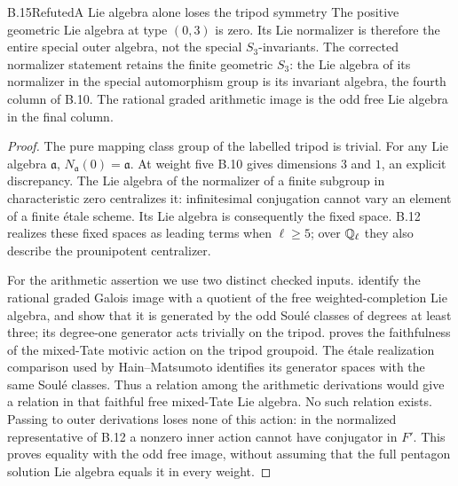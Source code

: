 \begin{statement}{B.15}{Refuted}{A Lie algebra alone loses the tripod symmetry}
The positive geometric Lie algebra at type $(0,3)$ is zero.
Its Lie normalizer is therefore the entire special outer
algebra, not the special $S_3$-invariants. The corrected
normalizer statement retains the finite geometric $S_3$:
the Lie algebra of its normalizer in the special
automorphism group is its invariant algebra, the fourth
column of B.10. The rational graded arithmetic image is
the odd free Lie algebra in the final column.
\end{statement}
\begin{proof}
The pure mapping class group of the labelled tripod is
trivial. For any Lie algebra $\mathfrak a$,
$N_{\mathfrak a}(0)=\mathfrak a$. At weight five B.10
gives dimensions $3$ and $1$, an explicit discrepancy.
The Lie algebra of the normalizer of a finite subgroup in
characteristic zero centralizes it: infinitesimal
conjugation cannot vary an element of a finite étale
scheme. Its Lie algebra is consequently the fixed space.
B.12 realizes these fixed spaces as leading terms when
$\ell\ge5$; over $\mathbb Q_\ell$ they also describe the
prounipotent centralizer.

For the arithmetic assertion we use two distinct checked
inputs. \citet[Theorem 8.4, Theorem 7.3 and Lemma 8.5]{HainMatsumoto2003}
identify the rational graded Galois image with a quotient
of the free weighted-completion Lie algebra, and show
that it is generated by the odd Soulé classes of degrees
at least three; its degree-one generator acts trivially
on the tripod. \citet[Theorem 1.1 and the deduction of
Conjecture 1 in the introduction]{Brown2012} proves the
faithfulness of the mixed-Tate motivic action on the
tripod groupoid. The étale realization comparison used
by Hain--Matsumoto identifies its generator spaces with
the same Soulé classes. Thus a relation among the
arithmetic derivations would give a relation in that
faithful free mixed-Tate Lie algebra. No such relation
exists. Passing to outer derivations loses none of this
action: in the normalized representative of B.12 a
nonzero inner action cannot have conjugator in $F'$.
This proves equality with the odd free image, without
assuming that the full pentagon solution Lie algebra
equals it in every weight.
\end{proof}

